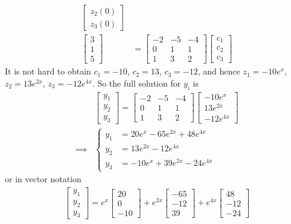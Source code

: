 \begin{solution}
\begin{align*}
\begin{bmatrix}
z_2(0) \\
z_3(0)
\end{bmatrix} \\
\begin{bmatrix}
3 \\
1 \\
5
\end{bmatrix}
&=
\begin{bmatrix}
-2 & -5 & -4 \\
0 & 1 & 1 \\
1 & 3 & 2
\end{bmatrix}
\begin{bmatrix}
c_1 \\
c_2 \\
c_3
\end{bmatrix}
\end{align*}
It is not hard to obtain $c_1 = -10$, $c_2 = 13$, $c_3 = -12$, and hence $z_1 = -10e^x$, $z_2 = 13e^{2x}$, $z_3 = -12e^{4x}$. So the full solution for $y_i$ is
\begin{align*}
&
\begin{bmatrix}
y_1 \\
y_2 \\
y_3
\end{bmatrix}
=
\begin{bmatrix}
-2 & -5 & -4 \\
0 & 1 & 1 \\
1 & 3 & 2
\end{bmatrix}
\begin{bmatrix}
-10e^x \\
13e^{2x} \\
-12e^{4x}
\end{bmatrix} \\
\implies & \begin{cases}
y_1 &= 20e^{x} - 65e^{2x} + 48e^{4x} \\
y_2 &= 13e^{2x} - 12e^{4x} \\
y_3 &= -10e^{x} + 39e^{2x} - 24e^{4x}
\end{cases}
\end{align*}
or in vector notation
\begin{align*}
\begin{bmatrix}
y_1 \\
y_2 \\
y_3
\end{bmatrix}
=
e^{x}
\begin{bmatrix}
20 \\
0 \\
-10
\end{bmatrix}
+
e^{2x}
\begin{bmatrix}
-65 \\
-12 \\
39
\end{bmatrix}
+
e^{4x}
\begin{bmatrix}
48 \\
-12 \\
-24
\end{bmatrix}
\end{align*}
\end{solution}
